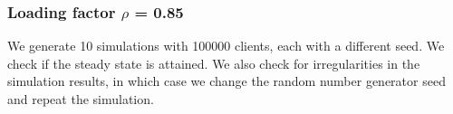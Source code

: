 \documentclass[]{article}
\begin{document}
\subsubsection{\texorpdfstring{Loading factor \(\rho\) =
0.85}{Loading factor \textbackslash{}rho = 0.85}}\label{loading-factor-rho-0.85}

We generate 10 simulations with 100000 clients, each with a different
seed. We check if the steady state is attained. We also check for
irregularities in the simulation results, in which case we change the
random number generator seed and repeat the simulation.

\end{document}

